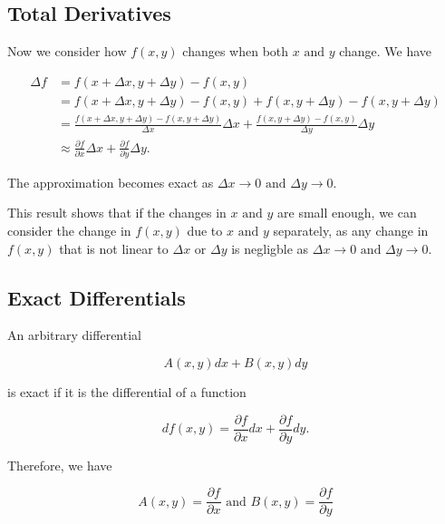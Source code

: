 \documentclass[english,a4paper,12pt]{report}
\begin{document}
\subsection{Total Derivatives}

Now we consider how \(f(x,y)\) changes when both \(x \text { and } y\) change. We have

\begin{equation} \label{totaldf} 
    \begin{aligned}
        \Delta f &= f(x+\Delta x,y+\Delta y) - f(x,y) \\
        &= f(x+\Delta x,y+\Delta y) - f(x,y) + f(x,y+\Delta y) - f(x,y+\Delta y) \\
        &= \frac{f(x+\Delta x,y+\Delta y)-f(x,y+\Delta y)}{\Delta x}\Delta x + \frac{f(x,y+\Delta y)-f(x,y)}{\Delta y} \Delta y \\
        &\approx \frac{\partial f}{\partial x} \Delta x + \frac{\partial f}{\partial y} \Delta y. 
    \end{aligned}
\end{equation}

The approximation becomes exact as \(\Delta x \rightarrow  0 \text { and }  \Delta y \rightarrow 0\). 

This result shows that if the changes in \(x \text { and } y\) are small enough, we can consider the change in \(f(x,y)\) due to \(x \text { and } y\) separately, as any change in \(f(x,y)\) that is not linear to \(\Delta x \text { or } \Delta y\) is negligble as \(\Delta x \rightarrow 0 \text { and } \Delta y \rightarrow 0\).     


\subsection{Exact Differentials}

An arbitrary differential 

\begin{equation}
    A(x,y) dx + B(x,y) dy
\end{equation}

is exact if it is the differential of a function 

\begin{equation}
    df(x,y) = \frac{\partial f}{\partial x} dx + \frac{\partial f}{\partial y} dy.
\end{equation}

Therefore, we have

\begin{equation}
    A(x,y) = \frac{\partial f}{\partial x} \text { and } B(x,y) = \frac{\partial f}{\partial y}
\end{equation}
\end{document}
